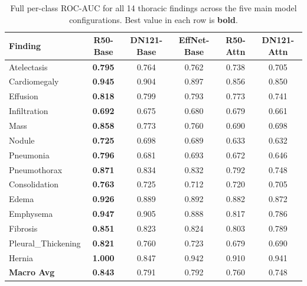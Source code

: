 \documentclass[12pt, a4paper]{article}
\begin{document}
\begin{table}[H]
  \centering
  \caption{Full per-class ROC-AUC for all 14 thoracic findings across the five main
           model configurations. Best value in each row is \textbf{bold}.}
  \label{tab:perclass}
  \begin{tabular}{lccccc}
    \toprule
    \textbf{Finding} & \textbf{R50-Base} & \textbf{DN121-Base} &
      \textbf{EffNet-Base} & \textbf{R50-Attn} & \textbf{DN121-Attn} \\
    \midrule
    Atelectasis        & \textbf{0.795} & 0.764 & 0.762 & 0.738 & 0.705 \\
    Cardiomegaly       & \textbf{0.945} & 0.904 & 0.897 & 0.856 & 0.850 \\
    Effusion           & \textbf{0.818} & 0.799 & 0.793 & 0.773 & 0.741 \\
    Infiltration       & \textbf{0.692} & 0.675 & 0.680 & 0.679 & 0.661 \\
    Mass               & \textbf{0.858} & 0.773 & 0.760 & 0.690 & 0.698 \\
    Nodule             & \textbf{0.725} & 0.698 & 0.689 & 0.633 & 0.632 \\
    Pneumonia          & \textbf{0.796} & 0.681 & 0.693 & 0.672 & 0.646 \\
    Pneumothorax       & \textbf{0.871} & 0.834 & 0.832 & 0.792 & 0.748 \\
    Consolidation      & \textbf{0.763} & 0.725 & 0.712 & 0.720 & 0.705 \\
    Edema              & \textbf{0.926} & 0.889 & 0.892 & 0.882 & 0.872 \\
    Emphysema          & \textbf{0.947} & 0.905 & 0.888 & 0.817 & 0.786 \\
    Fibrosis           & \textbf{0.851} & 0.823 & 0.824 & 0.803 & 0.789 \\
    Pleural\_Thickening & \textbf{0.821} & 0.760 & 0.723 & 0.679 & 0.690 \\
    Hernia             & \textbf{1.000} & 0.847 & 0.942 & 0.910 & 0.941 \\
    \midrule
    \textbf{Macro Avg} & \textbf{0.843} & 0.791 & 0.792 & 0.760 & 0.748 \\
    \bottomrule
  \end{tabular}
\end{table}
\end{document}
